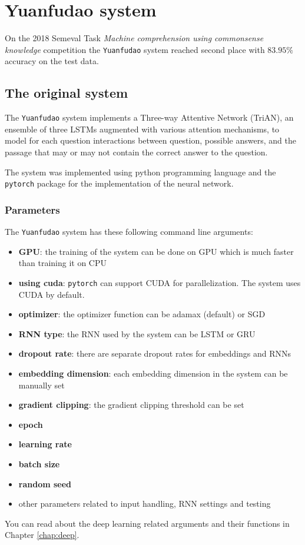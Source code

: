 \chapter{Yuanfudao system}
\label{chap:yuanfudao}
On the 2018 Semeval Task \textit{Machine comprehension using commonsense knowledge} competition the \texttt{Yuanfudao} \cite{Wang:2018} system reached second place with $83.95\%$ accuracy on the test data.

\section{The original system}

The \texttt{Yuanfudao} system implements a Three-way Attentive Network (TriAN), an ensemble of three LSTMs augmented with various attention mechanisms, to model for each question interactions between question, possible answers, and the passage that may or may not contain the correct answer to the question.

The system was implemented using python programming language and the \texttt{pytorch} package for the implementation of the neural network.

\subsection{Parameters}

The \texttt{Yuanfudao} system has these following command line arguments:
\begin{itemize}
	\item \textbf{GPU}: the training of the system can be done on GPU which is much faster than training it on CPU
	\item \textbf{using cuda}: \texttt{pytorch} can support CUDA for parallelization. The system uses CUDA by default.
	\item \textbf{optimizer}: the optimizer function can be adamax (default) or SGD
	\item \textbf{RNN type}: the RNN used by the system can be LSTM or GRU
	\item \textbf{dropout rate}: there are separate dropout rates for embeddings and RNNs
	\item \textbf{embedding dimension}: each embedding dimension in the system can be manually set
	\item \textbf{gradient clipping}: the gradient clipping threshold can be set
	\item \textbf{epoch}
	\item \textbf{learning rate}
	\item \textbf{batch size}
	\item \textbf{random seed}
	\item other parameters related to input handling, RNN settings and testing
\end{itemize}
You can read about the deep learning related arguments and their functions in Chapter \ref{chap:deep}.

